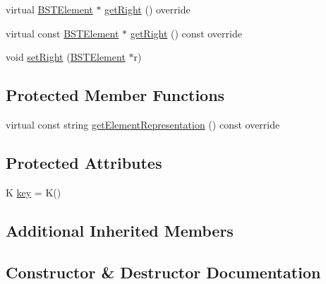 \begin{DoxyCompactItemize}
\item 
virtual \hyperlink{classbridges_1_1datastructure_1_1_b_s_t_element}{B\+S\+T\+Element} $\ast$ \hyperlink{classbridges_1_1datastructure_1_1_b_s_t_element_a80f5085d6d03805dd3091b7693d8e235}{get\+Right} () override
\item 
virtual const \hyperlink{classbridges_1_1datastructure_1_1_b_s_t_element}{B\+S\+T\+Element} $\ast$ \hyperlink{classbridges_1_1datastructure_1_1_b_s_t_element_a012f0eb09c3d62b14c73109e6ded0879}{get\+Right} () const override
\item 
void \hyperlink{classbridges_1_1datastructure_1_1_b_s_t_element_a9656227e934249edd0e414189c2cdae9}{set\+Right} (\hyperlink{classbridges_1_1datastructure_1_1_b_s_t_element}{B\+S\+T\+Element} $\ast$r)
\end{DoxyCompactItemize}
\subsection*{Protected Member Functions}
\begin{DoxyCompactItemize}
\item 
virtual const string \hyperlink{classbridges_1_1datastructure_1_1_b_s_t_element_a8f962a01b6e0eff59abeee7768264fd9}{get\+Element\+Representation} () const override
\end{DoxyCompactItemize}
\subsection*{Protected Attributes}
\begin{DoxyCompactItemize}
\item 
K \hyperlink{classbridges_1_1datastructure_1_1_b_s_t_element_ac1d971f8379c4ce6b956ebd635c88895}{key} = K()
\end{DoxyCompactItemize}
\subsection*{Additional Inherited Members}


\subsection{Constructor \& Destructor Documentation}
\mbox{\label{classbridges_1_1datastructure_1_1_b_s_t_element_a861caf985c223a9a848082fd5a4974fd}} 
